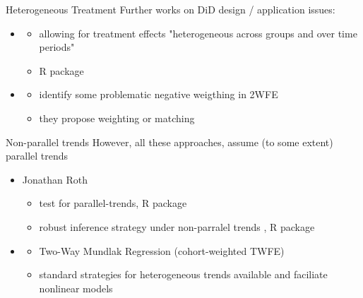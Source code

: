 \documentclass[aspectratio=169]{beamer}
\begin{document}
		\begin{frame}{Heterogeneous Treatment}
			Further works on DiD design / application issues:
			\\ \vspace*{.25cm}
			\begin{itemize}
				\item \cite{DeChaisemartin2018}
					\begin{itemize}
						\item allowing for treatment effects "heterogeneous across groups and over time periods"
						\item R package \href{https://cran.r-project.org/web/packages/DIDmultiplegt/index.html}{\underline{}}
					\end{itemize}
				\item \cite{Imai2020}
					\begin{itemize}
						\item identify some problematic negative weigthing in 2WFE
						\item they propose weighting or matching \href{https://imai.fas.harvard.edu/research/twoway.html}{\underline{}}
					\end{itemize}
			\end{itemize}
		\end{frame}

		\begin{frame}{Non-parallel trends}
			However, all these approaches, assume (to some extent) parallel trends
			\\ \vspace*{.25cm}
			\begin{itemize}
				\item Jonathan Roth \citeyear{Roth2021}
					\begin{itemize}
						\item test for parallel-trends, R package \href{https://github.com/jonathandroth/pretrends}{\underline{}}
						\item robust inference strategy under non-parralel trends \cite{Rambachan2020}, R package \href{https://github.com/asheshrambachan/HonestDiD}{\underline{}}
					\end{itemize}
				\item \cite{Wooldridge2021}
					\begin{itemize}
						\item Two-Way Mundlak Regression (cohort-weighted TWFE)
						\item standard strategies for heterogeneous trends available and faciliate nonlinear models
					\end{itemize}
			\end{itemize}
		\end{frame}
\end{document}
